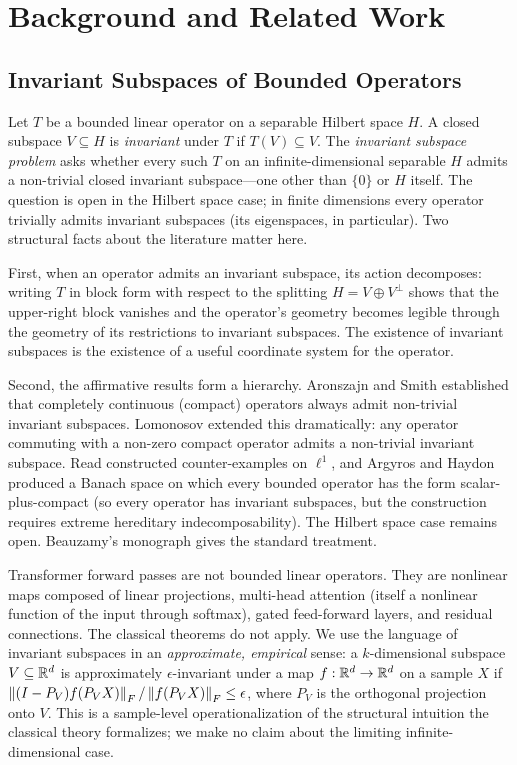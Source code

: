 \section{Background and Related Work}
\label{sec:background}

\subsection{Invariant Subspaces of Bounded Operators}

Let $T$ be a bounded linear operator on a separable Hilbert space $H$.
A closed subspace $V \subseteq H$ is \emph{invariant} under $T$ if
$T(V) \subseteq V$. The \emph{invariant subspace problem} asks whether
every such $T$ on an infinite-dimensional separable $H$ admits a
non-trivial closed invariant subspace---one other than $\{0\}$ or $H$
itself. The question is open in the Hilbert space case; in finite
dimensions every operator trivially admits invariant subspaces (its
eigenspaces, in particular). Two structural facts about the literature
matter here.

First, when an operator admits an invariant subspace, its action
decomposes: writing $T$ in block form with respect to the splitting
$H = V \oplus V^\perp$ shows that the upper-right block vanishes and
the operator's geometry becomes legible through the geometry of its
restrictions to invariant subspaces. The existence of invariant
subspaces is the existence of a useful coordinate system for the
operator.

Second, the affirmative results form a hierarchy. Aronszajn and Smith
\cite{aronszajn1954invariant} established that completely continuous
(compact) operators always admit non-trivial invariant subspaces.
Lomonosov \cite{lomonosov1973invariant} extended this dramatically: any
operator commuting with a non-zero compact operator admits a
non-trivial invariant subspace. Read \cite{read1984solution}
constructed counter-examples on $\ell^1$, and Argyros and Haydon
\cite{argyros2011hereditarily} produced a Banach space on which every
bounded operator has the form scalar-plus-compact (so every operator
has invariant subspaces, but the construction requires extreme
hereditary indecomposability). The Hilbert space case remains open.
Beauzamy's monograph \cite{beauzamy1988introduction} gives the standard
treatment.

Transformer forward passes are not bounded linear operators. They are
nonlinear maps composed of linear projections, multi-head attention
(itself a nonlinear function of the input through softmax), gated
feed-forward layers, and residual connections. The classical theorems
do not apply. We use the language of invariant subspaces in an
\emph{approximate, empirical} sense: a $k$-dimensional subspace
$V \subseteq \mathbb{R}^d$ is approximately $\epsilon$-invariant under a map
$f: \mathbb{R}^d \to \mathbb{R}^d$ on a sample $X$ if
$\left\lVert(I - P_V) f(P_V X)\right\rVert_F / \left\lVert f(P_V X)\right\rVert_F \leq \epsilon$, where
$P_V$ is the orthogonal projection onto $V$. This is a sample-level
operationalization of the structural intuition the classical theory
formalizes; we make no claim about the limiting infinite-dimensional
case.

